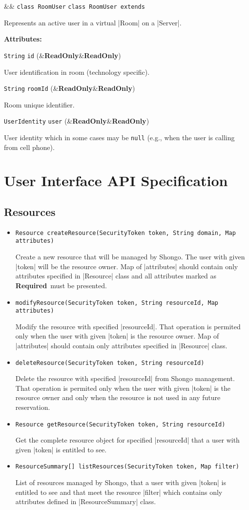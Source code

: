 \documentclass[a4paper]{report}
\newenvironment{Api}{\begin{itemize}}{\end{itemize}}
\newcommand{\ApiCode}[1]{\lstinline[style=styleApi]|#1|}
\newcommand{\ApiValue}[1]{\verb|#1|}
\newcommand{\ApiItem}[1]{\item #1 %

}
\newcommand{\ApiCmd}[1]{\ApiItem{\ApiCode{#1}}}
\newcommand{\ApiClass}[2]{\ApiItem{%
  \ifx&#2& \ApiCode{class #1} \else \ApiCode{class #1 extends #2} \fi}%
}
\newenvironment{ApiClassAttributes}{%

\begin{samepage}\textbf{Attributes:}\begin{compactitem}}{\end{compactitem}\end{samepage}}
\newcommand{\ApiRequired}{{\color{blue!50!black}\textbf{Required}}}
\newcommand{\ApiReadOnly}{{\color{red!50!black}\textbf{ReadOnly}}}
\newcommand{\ApiClassAttribute}[3]{\ApiItem{\ApiCode{#2} \ApiCode{#1} \hspace{1mm}(\ifx&#3&\ApiReadOnly\else#3\fi)
}}
\begin{document}
\begin{Api}
\ApiClass{RoomUser}{}
Represents an active user in a virtual |Room| on a |Server|.
\begin{ApiClassAttributes}
\ApiClassAttribute{id}{String}{\ApiReadOnly} 
User identification in room (technology specific).
\ApiClassAttribute{roomId}{String}{\ApiReadOnly} 
Room unique identifier.
\ApiClassAttribute{user}{UserIdentity}{\ApiReadOnly} 
User identity which in some cases may be \ApiValue{null} (e.g., when the user is calling from cell phone).
\end{ApiClassAttributes}

\end{Api}




\chapter{User Interface API Specification}

\section{Resources}

\begin{Api}

\ApiCmd{Resource createResource(SecurityToken token, String domain, Map attributes)}
Create a new resource that will be managed by Shongo. The user with given |token| will be the resource owner. Map of |attributes| should contain only attributes specified in |Resource| class and all attributes marked as \ApiRequired\ must be presented.

\ApiCmd{modifyResource(SecurityToken token, String resourceId, Map attributes)}
Modify the resource with specified |resourceId|. That operation is permited only when the user with given |token| is the resource owner. Map of |attributes| should contain only attributes specified in |Resource| class.

\ApiCmd{deleteResource(SecurityToken token, String resourceId)}
Delete the resource with specified |resourceId| from Shongo management. That operation is permited only when the user with given |token| is the resource owner and only when the resource is not used in any future reservation.

\ApiCmd{Resource getResource(SecurityToken token, String resourceId)}
Get the complete resource object for specified |resourceId| that a user with given |token| is entitled to see.

\ApiCmd{ResourceSummary[] listResources(SecurityToken token, Map filter)}
List of resources managed by Shongo, that a user with given |token| is entitled to see and that meet the resource |filter| which contains only attributes defined in |ResourceSummary| class.

\end{Api}
\end{document}
